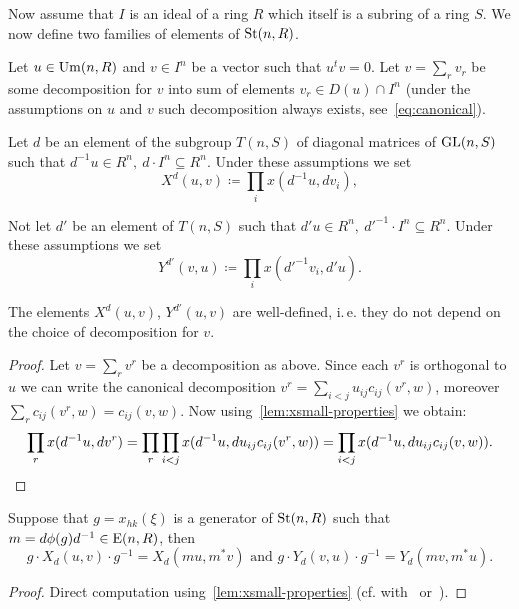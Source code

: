 Now assume that $I$ is an ideal of a ring $R$ which itself is a subring of a ring $S$.
We now define two families of elements of $\operatorname{St}(n, R)$.
\begin{dfn}
    Let $u \in \operatorname{Um}(n, R)$ and $v \in I^n$ be a vector such that $u^{t}v = 0$.
    Let $v = \sum_r v_r$ be some decomposition for $v$ into sum of elements $v_r \in D(u) \cap I^n$
    (under the assumptions on $u$ and $v$ such decomposition always exists, see~\eqref{eq:canonical}).

    Let $d$ be an element of the subgroup $T(n, S)$ of diagonal matrices of $\operatorname{GL}(n, S)$ such that
    $d^{-1}u \in R^n,\ d \cdot I^n \subseteq R^n.$
    Under these assumptions we set
    \begin{equation*}
        X^d(u, v) \coloneqq \prod_i x(d^{-1}u, dv_i),
    \end{equation*}

    Not let $d'$ be an element of $T(n, S)$ such that $d' u\in R^n,\ {d'}^{-1} \cdot I^n \subseteq R^n$.
    Under these assumptions we set
    \begin{equation*}
        Y^{d'}(v, u) \coloneqq \prod_i x({d'}^{-1} v_i, {d'}u).
    \end{equation*}
\end{dfn}

\begin{lemma}
    \label{lem:xy-wd}
    The elements $X^d(u, v)$, $Y^{d'}(u, v)$ are well-defined, i.\,e. they do not depend on the choice of decomposition for $v$.
\end{lemma}
\begin{proof}
    Let $v = \sum_r v^r$ be a decomposition as above.
    Since each $v^r$ is orthogonal to $u$ we can write the canonical decomposition
    $v^r = \sum_{i<j} u_{ij} c_{ij}(v^r, w)$, moreover $\sum_{r} c_{ij}(v^r, w) = c_{ij}(v, w)$.
    Now using~\cref{lem:xsmall-properties} we obtain:
    \begin{multline*}
        \prod\limits_r x(d^{-1}u, dv^r) = \prod\limits_{r}\prod\limits_{i<j} x(d^{-1} u, du_{ij}c_{ij}(v^r, w)) =
        \prod\limits_{i<j} x(d^{-1} u, d u_{ij}c_{ij}(v, w)). \qedhere
    \end{multline*}
\end{proof}

\begin{lemma}
    \label{lem:xy-conj} Suppose that $g = x_{hk}(\xi)$ is a generator of $\operatorname{St}(n, R)$ such that $m = d\phi(g)d^{-1} \in \operatorname{E}(n, R)$, then
    \begin{equation*}
        g \cdot X_d(u, v) \cdot g^{-1} = X_d(mu, m^*v) \text{ and } g \cdot Y_d(v, u) \cdot g^{-1} = Y_d(mv, m^*u).
    \end{equation*}
\end{lemma}
\begin{proof}
    Direct computation using~\cref{lem:xsmall-properties} (cf. with~\cite[3.14]{Ka77} or~\cite[Lemma~4.4d]{LS17}).
\end{proof}

